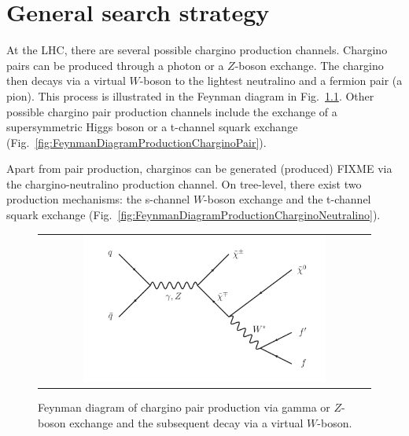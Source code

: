 
\FloatBarrier
\chapter{General search strategy}
\label{sec:GeneralSearchStrategy}

At the LHC, there are several possible chargino production channels. 
Chargino pairs can be produced through a photon or a $Z$-boson exchange. 
The chargino then decays via a virtual $W$-boson to the lightest neutralino and a fermion pair (\eg a pion). 
This process is illustrated in the Feynman diagram in Fig.~\ref{fig:FeynmanDiagram}.
Other possible chargino pair production channels include the exchange of a supersymmetric Higgs boson or a t-channel squark exchange (Fig.~\ref{fig:FeynmanDiagramProductionCharginoPair}).

Apart from pair production, charginos can be generated (produced) FIXME via the chargino-neutralino production channel. 
On tree-level, there exist two production mechanisms: the s-channel $W$-boson exchange and the t-channel squark exchange (Fig.~\ref{fig:FeynmanDiagramProductionCharginoNeutralino}).
\begin{figure}[!b]
  \centering 
  \begin{tabular}{c}
    \includegraphics[width=0.75\textwidth]{figures/analysis/ChiChi_ProductionAndDecay.pdf}
  \end{tabular}
  \caption{Feynman diagram of chargino pair production via gamma or $Z$-boson exchange and the subsequent decay via a virtual $W$-boson.}
  \label{fig:FeynmanDiagram}
\end{figure}


